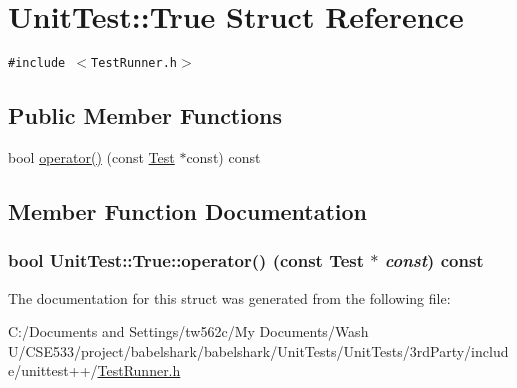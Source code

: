 \hypertarget{struct_unit_test_1_1_true}{
\section{UnitTest::True Struct Reference}
\label{struct_unit_test_1_1_true}
}
{\tt \#include $<$TestRunner.h$>$}

\subsection*{Public Member Functions}
\begin{CompactItemize}
\item 
bool \hyperlink{struct_unit_test_1_1_true_2d66b2e633f1d049ddf65096f6203e32}{operator()} (const \hyperlink{class_unit_test_1_1_test}{Test} $\ast$const) const 
\end{CompactItemize}


\subsection{Member Function Documentation}
\hypertarget{struct_unit_test_1_1_true_2d66b2e633f1d049ddf65096f6203e32}{
\subsubsection[{operator()}]{\setlength{\rightskip}{0pt plus 5cm}bool UnitTest::True::operator() (const {\bf Test} $\ast$ {\em const}) const}}
\label{struct_unit_test_1_1_true_2d66b2e633f1d049ddf65096f6203e32}




The documentation for this struct was generated from the following file:\begin{CompactItemize}
\item 
C:/Documents and Settings/tw562c/My Documents/Wash U/CSE533/project/babelshark/babelshark/UnitTests/UnitTests/3rdParty/include/unittest++/\hyperlink{_test_runner_8h}{TestRunner.h}\end{CompactItemize}
